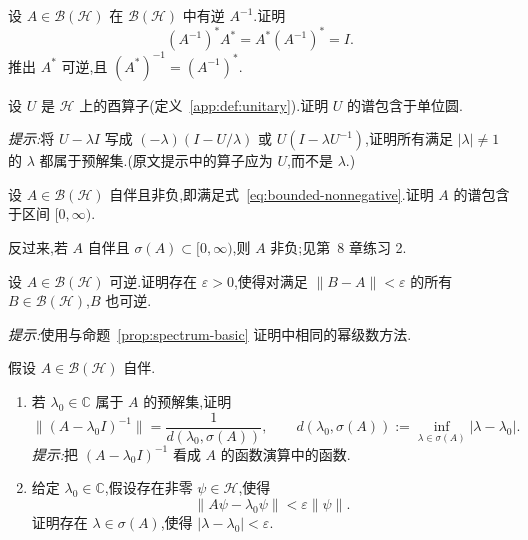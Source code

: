 {\begin{exercise}[逆算子的伴随]\label{ex:adjoint-inverse}
设 \(A\in\mathcal{B}(\mathcal{H})\) 在 \(\mathcal{B}(\mathcal{H})\) 中有逆 \(A^{-1}\).证明
\[
(A^{-1})^{*}A^{*}=A^{*}(A^{-1})^{*}=I.
\]
推出 \(A^{*}\) 可逆,且 \((A^{*})^{-1}=(A^{-1})^{*}\).
\end{exercise}

\begin{exercise}[酉算子的谱]\label{ex:unitary-spectrum}
设 \(U\) 是 \(\mathcal{H}\) 上的酉算子(定义~\ref{app:def:unitary}).证明 \(U\) 的谱包含于单位圆.

\emph{提示:}将 \(U-\lambda I\) 写成 \((-\lambda)(I-U/\lambda)\) 或 \(U(I-\lambda U^{-1})\),证明所有满足 \(|\lambda|\neq1\) 的 \(\lambda\) 都属于预解集.(原文提示中的算子应为 \(U\),而不是 \(\lambda\).)
\end{exercise}

\begin{exercise}[非负算子的谱]\label{ex:nonnegative-spectrum}
设 \(A\in\mathcal{B}(\mathcal{H})\) 自伴且非负,即满足式~\eqref{eq:bounded-nonnegative}.证明 \(A\) 的谱包含于区间 \([0,\infty)\).

\begin{note}
反过来,若 \(A\) 自伴且 \(\sigma(A)\subset[0,\infty)\),则 \(A\) 非负;见第~8 章练习 2.
\end{note}
\end{exercise}

\begin{exercise}[可逆性的稳定性]\label{ex:invertibility-stability}
设 \(A\in\mathcal{B}(\mathcal{H})\) 可逆.证明存在 \(\varepsilon>0\),使得对满足 \(\|B-A\|<\varepsilon\) 的所有 \(B\in\mathcal{B}(\mathcal{H})\),\(B\) 也可逆.

\emph{提示:}使用与命题~\ref{prop:spectrum-basic} 证明中相同的幂级数方法.
\end{exercise}

\begin{exercise}[自伴算子预解算子的范数]\label{ex:selfadjoint-resolvent-norm}
假设 \(A\in\mathcal{B}(\mathcal{H})\) 自伴.
\begin{enumerate}[label=(\alph*)]
\item 若 \(\lambda_{0}\in\mathbb{C}\) 属于 \(A\) 的预解集,证明
\[
\|(A-\lambda_{0}I)^{-1}\|
=\frac{1}{d(\lambda_{0},\sigma(A))},
\qquad
d(\lambda_{0},\sigma(A)):=\inf_{\lambda\in\sigma(A)}|\lambda-\lambda_{0}|.
\]
\emph{提示:}把 \((A-\lambda_{0}I)^{-1}\) 看成 \(A\) 的函数演算中的函数.
\item 给定 \(\lambda_{0}\in\mathbb{C}\),假设存在非零 \(\psi\in\mathcal{H}\),使得
\[
\|A\psi-\lambda_{0}\psi\|<\varepsilon\|\psi\|.
\]
证明存在 \(\lambda\in\sigma(A)\),使得 \(|\lambda-\lambda_{0}|<\varepsilon\).
\end{enumerate}
\end{exercise}

}
